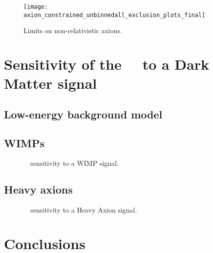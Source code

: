 		\begin{figure}
			\centering
			\texttt{[image: axion\_constrained\_unbinnedall\_exclusion\_plots\_final]}
			\caption{Limits on non-relativistic axions.}
			\label{fig:HeavyAxionLimits}
		\end{figure}
		

							
	\section{Sensitivity of the \MJ~\minmod~to a Dark Matter signal}
	\label{sec:MJSensitivity}
	
		\subsection{Low-energy background model}
		\label{sec:MJLowEnergyBackgroundModel}
		
		\subsection{WIMPs}
		\label{sec:MJSensitivityToWIMP}
		
			\begin{figure}
				\centering
				\caption{\MJ~\minmod~sensitivity to a WIMP signal.}
				\label{fig:MJSensitivityToWIMP}
			\end{figure}		
			
		\subsection{Heavy axions}
		\label{sec:MJSensitivityToAxions}
		
			\begin{figure}
				\centering
				\caption{\MJ~\minmod~sensitivity to a Heavy Axion signal.}
				\label{fig:MJSensitivityToHeavyAxions}
			\end{figure}							

	\section{Conclusions}
	\label{sec:OtherLowEnergyConclusions}	